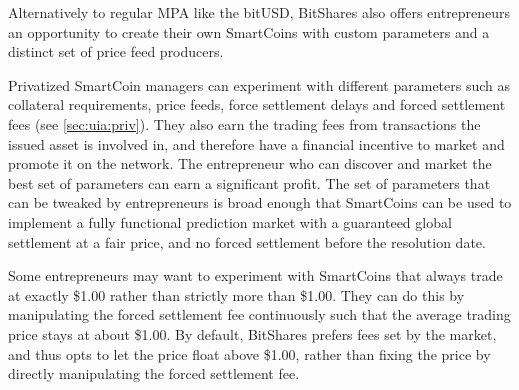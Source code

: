 Alternatively to regular MPA like the bitUSD, BitShares also offers
entrepreneurs an opportunity to create their own SmartCoins with custom
parameters and a distinct set of price feed producers.

Privatized SmartCoin managers can experiment with different parameters such as
collateral requirements, price feeds, force settlement delays and forced
settlement fees (see \cref{sec:uia:priv}). They also earn the trading fees from
transactions the issued asset is involved in, and therefore have a financial
incentive to market and promote it on the network. The entrepreneur who can
discover and market the best set of parameters can earn a significant profit.
The set of parameters that can be tweaked by entrepreneurs is broad enough that
SmartCoins can be used to implement a fully functional prediction market with a
guaranteed global settlement at a fair price, and no forced settlement before
the resolution date.

Some entrepreneurs may want to experiment with SmartCoins that always trade at
exactly \$1.00 rather than strictly more than \$1.00. They can do this by
manipulating the forced settlement fee continuously such that the average
trading price stays at about \$1.00. By default, BitShares prefers fees set by
the market, and thus opts to let the price float above \$1.00, rather than
fixing the price by directly manipulating the forced settlement fee.
